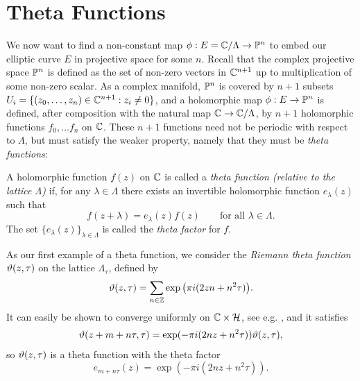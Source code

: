 \section{Theta Functions}

We now want to find a non-constant map $\phi:E = \mathbb{C}/\Lambda \rightarrow \mathbb{P}^{n}$ to embed our elliptic curve $E$ in projective space for some $n$. Recall that the complex projective space $\mathbb{P}^{n}$ is defined as the set of non-zero vectors in $\mathbb{C}^{n+1}$ up to multiplication of some non-zero scalar. As a complex manifold, $\mathbb{P}^{n}$ is covered by $n+1$ subsets $U_{i} = \{ (z_{0},\ldots, z_{n})\in \mathbb{C}^{n+1} : z_{i} \neq 0\}$, and a holomorphic map $\phi:E \rightarrow \mathbb{P}^{n}$ is defined, after composition with the natural map $\mathbb{C} \rightarrow \mathbb{C}/\Lambda$, by $n+1$ holomorphic functions $f_{0},\ldots f_{n}$ on $\mathbb{C}$. These $n+1$ functions need not be periodic with respect to $\Lambda$, but must satisfy the weaker property, namely that they must be \emph{theta functions}: \\

\begin{defn}
	A holomorphic function $f(z)$ on $\mathbb{C}$ is called a \emph{theta function (relative to the lattice $\Lambda$)} if, for any $\lambda \in \Lambda$ there exists an invertible holomorphic function $e_{\lambda}(z)$ such that
	\begin{equation*}
		f(z + \lambda) = e_{\lambda}(z)f(z)\qquad\text{for all } \lambda \in \Lambda.
	\end{equation*}
	The set $\{e_{\lambda}(z)\}_{\lambda \in \Lambda}$ is called the \emph{theta factor} for $f$.
\end{defn}

As our first example of a theta function, we consider the \emph{Riemann theta function} $\vartheta(z,\tau)$ on the lattice $\Lambda_{\tau}$, defined by
\begin{equation*}
	\vartheta(z,\tau) = \sum_{n\in \mathbb{Z}}\exp\big(\pi i(2zn + n^{2}\tau)\big).
\end{equation*}
It can easily be shown to converge uniformly on $\mathbb{C}\times \mathcal{H}$, see e.g. \cite{Mumford_1983}, and it satisfies
\begin{equation*}
	\begin{split}
	\vartheta(z + m + n\tau,\tau) = \exp(-\pi i (2nz + n^{2}\tau))\vartheta(z,\tau),
	\end{split}
\end{equation*}
so $\vartheta(z,\tau)$ is a theta function with the theta factor
\begin{equation*}
	e_{m+n\tau}(z) = \exp(-\pi i (2nz + n^{2}\tau)).
\end{equation*}

